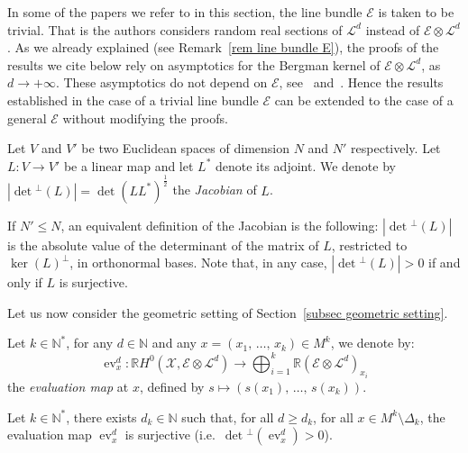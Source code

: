 \documentclass[AHL,Unicode,longabstracts,published]{cedram}
\DeclareMathOperator{\ev}{ev}
\newcommand{\E}{\mathcal{E}}
\newcommand{\X}{\mathcal{X}}
\renewcommand{\L}{\mathcal{L}}
\newcommand{\N}{\mathbb{N}}
\newcommand{\R}{\mathbb{R}}
\newcommand{\odet}[1]{\norm{\det\! ^\perp\!\left(#1\right)}}
\newcommand{\norm}[1]{\left\lvert #1 \right\rvert}
\renewcommand{\geq}{\geqslant}
\renewcommand{\leq}{\leqslant}
\begin{document}
\begin{rema}
In some of the papers we refer to in this section, the line bundle $\E$ is taken to be trivial. That is the authors considers random real sections of $\L^d$ instead of $\E \otimes \L^d$. As we already explained (see Remark~\ref{rem line bundle E}), the proofs of the results we cite below rely on asymptotics for the Bergman kernel of $\E \otimes \L^d$, as $d \to +\infty$. These asymptotics do not depend on $\E$, see~\cite[Theorem~4.2.1]{MM2007} and~\cite[Theorem~1]{MM2015}. Hence the results established in the case of a trivial line bundle $\E$ can be extended to the case of a general $\E$ without modifying the proofs.
\end{rema}

\begin{defi}[{Jacobian}]\label{def jacobian}
Let $V$ and $V'$ be two Euclidean spaces of dimension $N$ and $N'$ respectively. Let $L:V \to V'$ be a linear map and let $L^*$ denote its adjoint. We denote by $\odet{L} = \det(LL^*)^\frac{1}{2}$ the \emph{Jacobian} of $L$.
\end{defi}

\begin{rema}
If $N' \leq N$, an equivalent definition of the Jacobian is the following: $|\det\!^\perp\!(L)|$ is the absolute value of the determinant of the matrix of $L$, restricted to $\ker(L)^\perp$, in orthonormal bases. Note that, in any case, $|\det\!^\perp\!(L)| > 0$ if and only if $L$ is surjective.
\end{rema}

Let us now consider the geometric setting of Section~\ref{subsec geometric setting}.

\begin{defi}\label{def ev dx}
Let $k \in \N^*$, for any $d \in \N$ and any $x=(x_1,\,\dots,\,x_k)\in M^k$, we denote by:
\[
\ev^d_x:\R H^0\left(\X,\E \otimes \L^d\right) \longrightarrow \bigoplus_{i=1}^k \R\left(\E \otimes \L^d\right)_{x_i}
\]
the \emph{evaluation map} at $x$, defined by $s\mapsto (s(x_1),\,\dots,\,s(x_k))$.
\end{defi}

\begin{lemm}\label{lem surjectivity ev dx}
Let $k \in \N^*$, there exists $d_k \in \N$ such that, for all $d \geq d_k$, for all $x \in M^k \setminus \Delta_k$, the evaluation map $\ev^d_x$ is surjective (i.e.~$\det\!^\perp\!(\ev_x^d)>0$).
\end{lemm}
\end{document}
